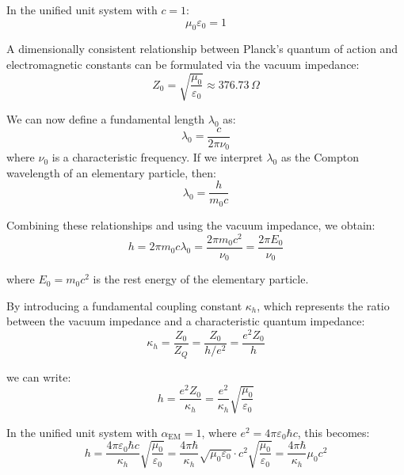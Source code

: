 \documentclass[12pt,a4paper]{article}
\newcommand{\alphaEM}{\alpha_{\text{EM}}}
\begin{document}
	In the unified unit system with \(c = 1\):
	\begin{equation}
		\mu_0 \varepsilon_0 = 1
	\end{equation}
	
	A dimensionally consistent relationship between Planck's quantum of action and electromagnetic constants can be formulated via the vacuum impedance:
	\begin{equation}
		Z_0 = \sqrt{\frac{\mu_0}{\varepsilon_0}} \approx 376.73 \, \Omega
	\end{equation}
	
	We can now define a fundamental length \(\lambda_0\) as:
	\begin{equation}
		\lambda_0 = \frac{c}{2\pi \nu_0}
	\end{equation}
	where \(\nu_0\) is a characteristic frequency. If we interpret \(\lambda_0\) as the Compton wavelength of an elementary particle, then:
	\begin{equation}
		\lambda_0 = \frac{h}{m_0 c}
	\end{equation}
	
	Combining these relationships and using the vacuum impedance, we obtain:
	\begin{equation}
		h = 2\pi m_0 c \lambda_0 = \frac{2\pi m_0 c^2}{\nu_0} = \frac{2\pi E_0}{\nu_0}
	\end{equation}
	
	where \(E_0 = m_0 c^2\) is the rest energy of the elementary particle.
	
	By introducing a fundamental coupling constant \(\kappa_h\), which represents the ratio between the vacuum impedance and a characteristic quantum impedance:
	\begin{equation}
		\kappa_h = \frac{Z_0}{Z_Q} = \frac{Z_0}{h/e^2} = \frac{e^2 Z_0}{h}
	\end{equation}
	
	we can write:
	\begin{equation}
		h = \frac{e^2 Z_0}{\kappa_h} = \frac{e^2}{\kappa_h} \sqrt{\frac{\mu_0}{\varepsilon_0}}
	\end{equation}
	
	In the unified unit system with \(\alphaEM = 1\), where \(e^2 = 4\pi\varepsilon_0\hbar c\), this becomes:
	\begin{equation}
		h = \frac{4\pi\varepsilon_0\hbar c}{\kappa_h} \sqrt{\frac{\mu_0}{\varepsilon_0}} = \frac{4\pi\hbar}{\kappa_h} \sqrt{\mu_0\varepsilon_0} \cdot c^2 \sqrt{\frac{\mu_0}{\varepsilon_0}} = \frac{4\pi\hbar}{\kappa_h} \mu_0 c^2
	\end{equation}
	
\end{document}
